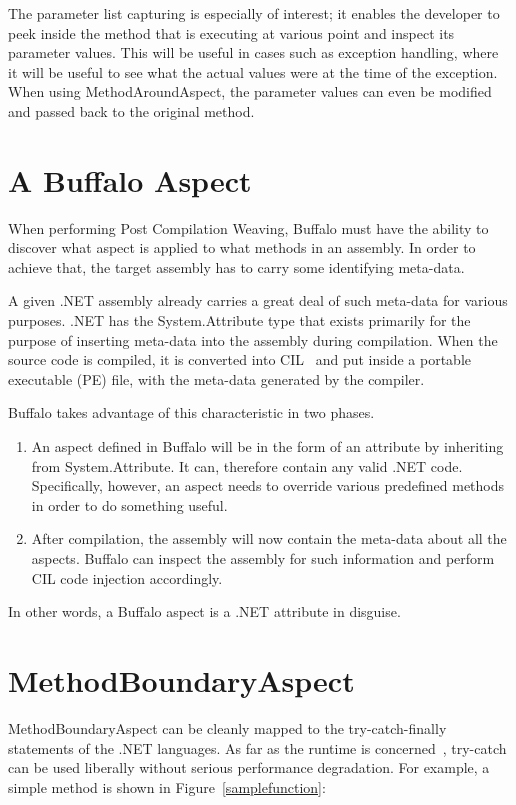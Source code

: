 The parameter list capturing is especially of interest; it enables the developer to peek inside the method that is executing at various point and inspect its parameter values. This will be useful in cases such as exception handling, where it will be useful to see what the actual values were at the time of the exception. When using MethodAroundAspect, the parameter values can even be modified and passed back to the original method.


\section{A Buffalo Aspect}

When performing Post Compilation Weaving, Buffalo must have the ability to discover what aspect is applied to what methods in an assembly. In order to achieve that, the target assembly has to carry some identifying meta-data.

A given .NET assembly already carries a great deal of such meta-data for various purposes. .NET has the System.Attribute type that exists primarily for the purpose of inserting meta-data into the assembly during compilation. When the source code is compiled, it is converted into CIL~\cite{msil_text} and put inside a portable executable (PE) file, with the meta-data generated by the compiler. 

Buffalo takes advantage of this characteristic in two phases.
\begin{enumerate}
	\item An aspect defined in Buffalo will be in the form of an attribute by inheriting from System.Attribute. It can, therefore contain any valid .NET code. Specifically, however, an aspect needs to override various predefined methods in order to do something useful.
	\item After compilation, the assembly will now contain the meta-data about all the aspects. Buffalo can inspect the assembly for such information and perform CIL code injection accordingly.
\end{enumerate}

In other words, a Buffalo aspect is a .NET attribute in disguise.

\section{MethodBoundaryAspect}
MethodBoundaryAspect can be cleanly mapped to the try-catch-finally statements of the .NET languages. As far as the runtime is concerned~\cite{ecma334, ecma335}, try-catch can be used liberally without serious performance degradation. For example, a simple method is shown in Figure~\ref{samplefunction}:

